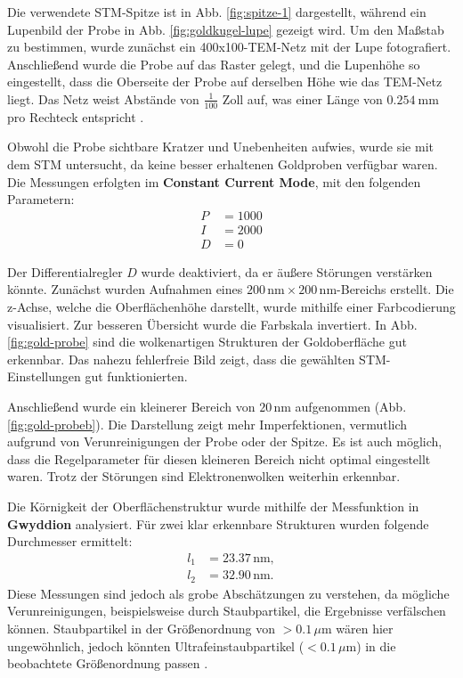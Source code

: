 \documentclass{article}
\begin{document}
Die verwendete STM-Spitze ist in Abb. \ref{fig:spitze-1} dargestellt, während ein Lupenbild der Probe in Abb. \ref{fig:goldkugel-lupe} gezeigt wird. Um den Maßstab zu bestimmen, wurde zunächst ein 400x100-TEM-Netz mit der Lupe fotografiert. Anschließend wurde die Probe auf das Raster gelegt, und die Lupenhöhe so eingestellt, dass die Oberseite der Probe auf derselben Höhe wie das TEM-Netz liegt. Das Netz weist Abstände von $\frac{1}{100}$ Zoll auf, was einer Länge von $\SI{0.254}{\mm}$ pro Rechteck entspricht \cite{meshsize}.

Obwohl die Probe sichtbare Kratzer und Unebenheiten aufwies, wurde sie mit dem STM untersucht, da keine besser erhaltenen Goldproben verfügbar waren. Die Messungen erfolgten im \textbf{Constant Current Mode}, mit den folgenden Parametern: 
\begin{align*}
    P &= 1000 \\
    I &= 2000 \\
    D &= 0
\end{align*}

Der Differentialregler $D$ wurde deaktiviert, da er äußere Störungen verstärken könnte. Zunächst wurden Aufnahmen eines $200 \, \text{nm} \times 200 \, \text{nm}$-Bereichs erstellt. Die z-Achse, welche die Oberflächenhöhe darstellt, wurde mithilfe einer Farbcodierung visualisiert. Zur besseren Übersicht wurde die Farbskala invertiert. In Abb. \ref{fig:gold-probe} sind die wolkenartigen Strukturen der Goldoberfläche gut erkennbar. Das nahezu fehlerfreie Bild zeigt, dass die gewählten STM-Einstellungen gut funktionierten.


Anschließend wurde ein kleinerer Bereich von $20 \, \text{nm}$ aufgenommen (Abb. \ref{fig:gold-probeb}). Die Darstellung zeigt mehr Imperfektionen, vermutlich aufgrund von Verunreinigungen der Probe oder der Spitze. Es ist auch möglich, dass die Regelparameter für diesen kleineren Bereich nicht optimal eingestellt waren. Trotz der Störungen sind Elektronenwolken weiterhin erkennbar.



Die Körnigkeit der Oberflächenstruktur wurde mithilfe der Messfunktion in \textbf{Gwyddion} analysiert. Für zwei klar erkennbare Strukturen wurden folgende Durchmesser ermittelt:
\begin{align*}
    l_1 &= 23.37 \, \text{nm}, \\
    l_2 &= 32.90 \, \text{nm}.
\end{align*}
Diese Messungen sind jedoch als grobe Abschätzungen zu verstehen, da mögliche Verunreinigungen, beispielsweise durch Staubpartikel, die Ergebnisse verfälschen können. Staubpartikel in der Größenordnung von $>0.1 \, \mu\text{m}$ wären hier ungewöhnlich, jedoch könnten Ultrafeinstaubpartikel ($<0.1 \, \mu\text{m}$) in die beobachtete Größenordnung passen \cite{feinstaub}.
\end{document}
